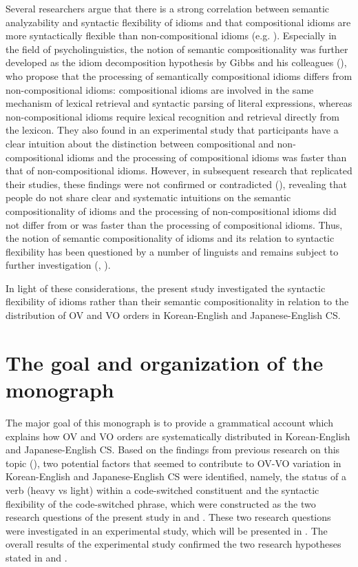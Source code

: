 Several researchers argue that there is a strong correlation between semantic analyzability and syntactic flexibility of idioms and that compositional idioms are more syntactically flexible than non-compositional idioms (e.g. \citealt{GibbsNayak1989,Nediger2017,Nunberg1978,NunbergEtAl1994}). Especially in the field of psycholinguistics, the notion of semantic compositionality was further developed as the idiom decomposition hypothesis by Gibbs and his colleagues (\citealt{GibbsEtAl1989,GibbsNayak1989}), who propose that the processing of semantically compositional idioms differs from non-compositional idioms: compositional idioms are involved in the same mechanism of lexical retrieval and syntactic parsing of literal expressions, whereas non-compositional idioms require lexical recognition and retrieval directly from the lexicon. They also found in an experimental study that participants have a clear intuition about the distinction between compositional and non-compositional idioms and the processing of compositional idioms was faster than that of non-compositional idioms. However, in subsequent research that replicated their studies, these findings were not confirmed or contradicted (\citealt{TitoneConnine1994,TabossiEtAl2008}), revealing that people do not share clear and systematic intuitions on the semantic compositionality of idioms and the processing of non-compositional idioms did not differ from or was faster than the processing of compositional idioms. Thus, the notion of semantic compositionality of idioms and its relation to syntactic flexibility has been questioned by a number of linguists and remains subject to further investigation (\citealt{Abeille1995}, \citealt{AckermanWebelhuth1997,Horn2003,Jackendoff1997,Ruwet1991,LibbenEtAl2008}). 

In light of these considerations, the present study investigated the syntactic flexibility of idioms rather than their semantic compositionality in relation to the distribution of \ac{OV} and \ac{VO} orders in Korean-English and Japanese-English \ac{CS}. 

\section{The goal and organization of the monograph}\label{ch1:sect:Outline}

The major goal of this monograph is to provide a grammatical account which explains how \ac{OV} and \ac{VO} orders are systematically distributed in Korean-English and Japanese-English \ac{CS}. Based on the findings from previous research on this topic (\citealt{Shim2011}), two potential factors that seemed to contribute to \ac{OV}-\ac{VO} variation in Korean-English and Japanese-English \ac{CS} were identified, namely, the status of a verb (heavy vs light) within a code-switched constituent and the syntactic flexibility of the code-switched phrase, which were constructed as the two research questions of the present study in  and . These two research questions were investigated in an experimental study, which will be presented in . The overall results of the experimental study confirmed the two research hypotheses stated in  and .

